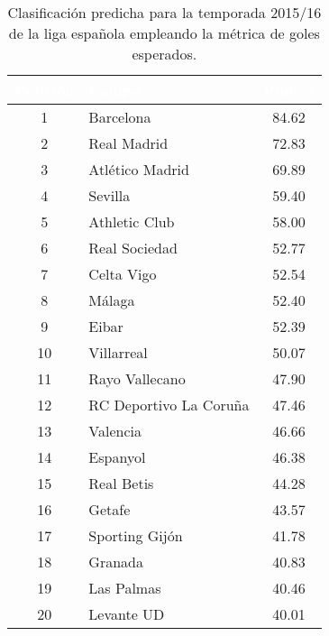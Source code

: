 \begin{table}[H]
\centering
\begin{tabular}{|c|l|c|}
\hline
\rowcolor{black} 
\textcolor{white}{\textbf{Posición}} & \textcolor{white}{\textbf{Equipo}} & \textcolor{white}{\textbf{Puntos}} \\ 
\hline
\cellcolor{yellow} 1  & \cellcolor{yellow} Barcelona        & \cellcolor{yellow} 84.62 \\ 
\hline
\cellcolor{gray} 2  & \cellcolor{gray} Real Madrid         & \cellcolor{gray} 72.83 \\ 
\hline
\cellcolor{brown} 3  & \cellcolor{brown} Atlético Madrid    & \cellcolor{brown} 69.89 \\ 
\hline
4  & Sevilla                & 59.40 \\ 
\hline
5  & Athletic Club          & 58.00 \\ 
\hline
6  & Real Sociedad          & 52.77 \\ 
\hline
7  & Celta Vigo             & 52.54 \\ 
\hline
8  & Málaga                 & 52.40 \\ 
\hline
9  & Eibar                  & 52.39 \\ 
\hline
10 & Villarreal             & 50.07 \\ 
\hline
11 & Rayo Vallecano         & 47.90 \\ 
\hline
12 & RC Deportivo La Coruña & 47.46 \\ 
\hline
13 & Valencia               & 46.66 \\ 
\hline
14 & Espanyol               & 46.38 \\ 
\hline
15 & Real Betis             & 44.28 \\ 
\hline
16 & Getafe                 & 43.57 \\ 
\hline
17 & Sporting Gijón         & 41.78 \\ 
\hline
\cellcolor{red} 18 & \cellcolor{red} Granada               & \cellcolor{red} 40.83 \\ 
\hline
\cellcolor{red} 19 & \cellcolor{red} Las Palmas            & \cellcolor{red} 40.46 \\ 
\hline
\cellcolor{red} 20 & \cellcolor{red} Levante UD            & \cellcolor{red} 40.01 \\ 
\hline
\end{tabular}
\caption{Clasificación predicha para la temporada 2015/16 de la liga española empleando la métrica de goles esperados.}
\label{table:clasificacion}
\end{table}

